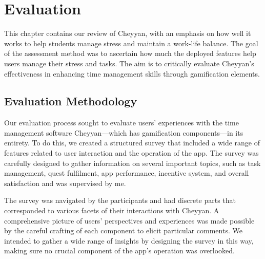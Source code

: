 \documentclass{l4proj}
\begin{document}





\chapter{Evaluation} 
This chapter contains our review of Cheyyan, with an emphasis on how well it works to help students manage stress and maintain a work-life balance. The goal of the assessment method was to ascertain how much the deployed features help users manage their stress and tasks. The aim is to critically evaluate Cheyyan's effectiveness in enhancing time management skills through gamification elements.

\section{Evaluation Methodology}

Our evaluation process sought to evaluate users' experiences with the time management software Cheyyan—which has gamification components—in its entirety. To do this, we created a structured survey that included a wide range of features related to user interaction and the operation of the app. The survey was carefully designed to gather information on several important topics, such as task management, quest fulfilment, app performance, incentive system, and overall satisfaction and was supervised by me.

The survey was navigated by the participants and had discrete parts that corresponded to various facets of their interactions with Cheyyan. A comprehensive picture of users' perspectives and experiences was made possible by the careful crafting of each component to elicit particular comments. We intended to gather a wide range of insights by designing the survey in this way, making sure no crucial component of the app's operation was overlooked.
\end{document}
